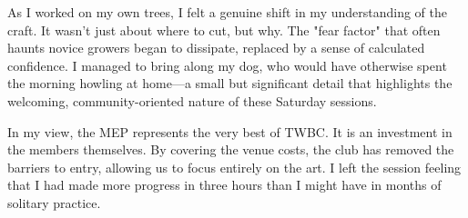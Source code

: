 \medskip
{}
\noindent
As I worked on my own trees, I felt a genuine shift in my understanding of the craft. It wasn't just about where to cut, but why. The "fear factor" that often haunts novice growers began to dissipate, replaced by a sense of calculated confidence. I managed to bring along my dog, who would have otherwise spent the morning howling at home—a small but significant detail that highlights the welcoming, community-oriented nature of these Saturday sessions.

In my view, the MEP represents the very best of TWBC. It is an investment in the members themselves. By covering the venue costs, the club has removed the barriers to entry, allowing us to focus entirely on the art. I left the session feeling that I had made more progress in three hours than I might have in months of solitary practice.

